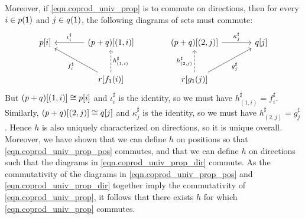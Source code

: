 \documentclass[Book-Poly]{subfiles}
\begin{document}
\begin{exercise}
\begin{solution}
Moreover, if \eqref{eqn.coprod_univ_prop} is to commute on directions, then for every $i \in p(\textsf{1})$ and $j \in q(\textsf{1})$, the following diagrams of sets must commute:
\begin{equation} \label{eqn.coprod_univ_prop_dir}
\begin{tikzcd}[sep=large]
	p[i] & (p+q)[(1,i)] \ar[l, "\iota^\sharp_i"'] & (p+q)[(2,j)] \ar[r, "\kappa^\sharp_j"] & q[j] \\
	& r[f_\1(i)] \ar[ul, "f^\sharp_i"] \ar[u, "h^\sharp_{(1,i)}"', dashed] & r[g_\1(j)] \ar[u, "h^\sharp_{(2,j)}", dashed] \ar[ur, "g^\sharp_j"']
\end{tikzcd}
\end{equation}
But $(p+q)[(1,i)] \cong p[i]$ and $\iota^\sharp_i$ is the identity, so we must have $h^\sharp_{(1,i)} = f^\sharp_i$.
Similarly, $(p+q)[(2,j)] \cong q[j]$ and $\kappa^\sharp_j$ is the identity, so we must have $h^\sharp_{(2,j)} = g^\sharp_j$.
Hence $h$ is also uniquely characterized on directions, so it is unique overall.
Moreover, we have shown that we can define $h$ on positions so that \eqref{eqn.coprod_univ_prop_pos} commutes, and that we can define $h$ on directions such that the diagrams in \eqref{eqn.coprod_univ_prop_dir} commute.
As the commutativity of the diagrams in \eqref{eqn.coprod_univ_prop_pos} and \eqref{eqn.coprod_univ_prop_dir} together imply the commutativity of \eqref{eqn.coprod_univ_prop}, it follows that there exists $h$ for which \eqref{eqn.coprod_univ_prop} commutes.
\end{solution}
\end{exercise}
\end{document}
